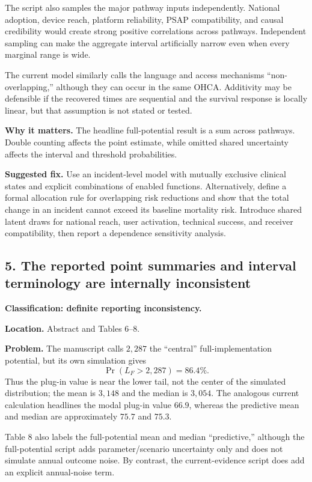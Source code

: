 \documentclass[11pt]{article}
\begin{document}
The script also samples the major pathway inputs independently.  National
adoption, device reach, platform reliability, PSAP compatibility, and causal
credibility would create strong positive correlations across pathways.
Independent sampling can make the aggregate interval artificially narrow even
when every marginal range is wide.

The current model similarly calls the language and access mechanisms
``non-overlapping,'' although they can occur in the same OHCA.  Additivity may
be defensible if the recovered times are sequential and the survival response
is locally linear, but that assumption is not stated or tested.

\textbf{Why it matters.} The headline full-potential result is a sum across
pathways.  Double counting affects the point estimate, while omitted shared
uncertainty affects the interval and threshold probabilities.

\textbf{Suggested fix.} Use an incident-level model with mutually exclusive
clinical states and explicit combinations of enabled functions.  Alternatively,
define a formal allocation rule for overlapping risk reductions and show that
the total change in an incident cannot exceed its baseline mortality risk.
Introduce shared latent draws for national reach, user activation, technical
success, and receiver compatibility, then report a dependence sensitivity
analysis.

\subsection*{5. The reported point summaries and interval terminology are internally inconsistent}

\textbf{Classification: definite reporting inconsistency.}

\textbf{Location.} Abstract and Tables 6--8.

\textbf{Problem.} The manuscript calls $2{,}287$ the ``central''
full-implementation potential, but its own simulation gives
\[
\Pr(L_F>2{,}287)=86.4\%.
\]
Thus the plug-in value is near the lower tail, not the center of the simulated
distribution; the mean is $3{,}148$ and the median is $3{,}054$.  The analogous
current calculation headlines the modal plug-in value $66.9$, whereas the
predictive mean and median are approximately $75.7$ and $75.3$.

Table 8 also labels the full-potential mean and median ``predictive,'' although
the full-potential script adds parameter/scenario uncertainty only and does not
simulate annual outcome noise.  By contrast, the current-evidence script does
add an explicit annual-noise term.
\end{document}
